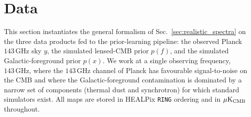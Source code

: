 \documentclass[11pt]{article}
\theoremstyle{definition}
\begin{document}
\section{Data}
\label{sec:data}

This section instantiates the general formalism of Sec.~\ref{sec:realistic_spectra} on the three data products fed to the prior-learning pipeline: the observed Planck $143\,\mathrm{GHz}$ sky $y$, the simulated lensed-CMB prior $p(f)$, and the simulated Galactic-foreground prior $p(x)$. We work at a single observing frequency, $143\,\mathrm{GHz}$, where the $143\,\mathrm{GHz}$ channel of Planck has favourable signal-to-noise on the CMB and where the Galactic-foreground contamination is dominated by a narrow set of components (thermal dust and synchrotron) for which standard simulators exist. All maps are stored in HEALPix \texttt{RING} ordering and in $\mu\mathrm{K}_{\rm CMB}$ throughout.
\end{document}
